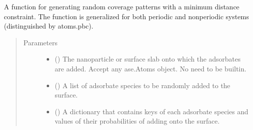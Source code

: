 \documentclass[letterpaper,10pt,english]{sphinxmanual}
\begin{document}
\begin{fulllineitems}
\label{\detokenize{build:acat.build.patterns.random_coverage_pattern}}
A function for generating random coverage patterns with a
minimum distance constraint. The function is generalized for
both periodic and non\sphinxhyphen{}periodic systems (distinguished by
atoms.pbc).
\begin{quote}\begin{description}
\item[{Parameters}] \leavevmode\begin{itemize}
\item {} 
 () \textendash{} The nanoparticle or surface slab onto which the adsorbates are
added. Accept any ase.Atoms object. No need to be built\sphinxhyphen{}in.

\item {} 
 () \textendash{} A list of adsorbate species to be randomly added to the surface.

\item {} 
 (\sphinxstyleliteralemphasis{\sphinxupquote{, }}) \textendash{} A dictionary that contains keys of each adsorbate species and
values of their probabilities of adding onto the surface.


\end{itemize}
\end{description}
\end{quote}
\end{fulllineitems}
\end{document}
